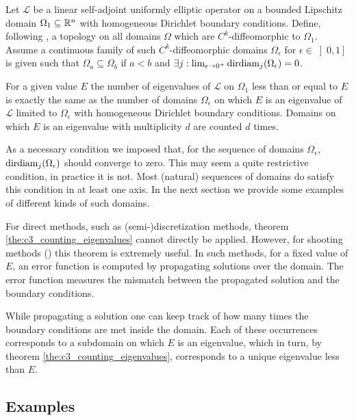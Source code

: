 \begin{theorem}\label{the:c3_counting_eigenvalues}
  Let $\mathcal{L}$ be a linear self-adjoint uniformly elliptic operator on a bounded Lipschitz domain $\Omega_1 \subseteq \mathbb{R}^n$ with homogeneous Dirichlet boundary conditions. Define, following \cite{hale_eigenvalues_2005}, a topology on all domains $\Omega$ which are $C^k$-diffeomorphic to $\Omega_1$.  Assume a continuous family of such $C^k$-diffeomorphic domains $\Omega_\epsilon$ for $\epsilon\in\left]0, 1\right]$ is given such that $\Omega_a \subseteq \Omega_b$ if $a < b$ and $\exists j : \lim_{\epsilon\to 0^+} \operatorname{dirdiam}_j(\Omega_\epsilon) = 0$.

  For a given value $E$ the number of eigenvalues of $\mathcal{L}$ on $\Omega_1$ less than or equal to $E$ is exactly the same as the number of domains $\Omega_\epsilon$ on which $E$ is an eigenvalue of $\mathcal{L}$ limited to $\Omega_\epsilon$ with homogeneous Dirichlet boundary conditions. Domains on which $E$ is an eigenvalue with multiplicity $d$ are counted $d$ times.
\end{theorem}

As a necessary condition we imposed that, for the sequence of domains $\Omega_\epsilon$, $\operatorname{dirdiam}_j(\Omega_\epsilon)$ should converge to zero. This may seem a quite restrictive condition, in practice it is not. Most (natural) sequences of domains do satisfy this condition in at least one axis. In the next section we provide some examples of different kinds of such domains.

For direct methods, such as (semi-)discretization methods, theorem \ref{the:c3_counting_eigenvalues} cannot directly be applied. However, for shooting methods (\cite{ixaru_new_2010,baeyens_improvements_2022}) this theorem is extremely useful.
In such methods, for a fixed value of $E$, an error function is computed by propagating solutions over the domain. The error function measures the mismatch between the propagated solution and the boundary conditions.

While propagating a solution one can keep track of how many times the boundary conditions are met inside the domain. Each of these occurrences corresponds to a subdomain on which $E$ is an eigenvalue, which in turn, by theorem \ref{the:c3_counting_eigenvalues}, corresponds to a unique eigenvalue less than $E$.


\subsection{Examples}\label{sec:c3_counting_examples}

